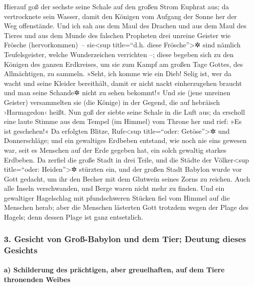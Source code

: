  Hierauf goß der sechste seine Schale auf den großen
Strom Euphrat aus; da vertrocknete sein Wasser, damit den Königen vom
Aufgang der Sonne her der Weg offenstände.  Und ich sah
aus dem Maul des Drachen und aus dem Maul des Tieres und aus dem Munde
des falschen Propheten drei unreine Geister wie Frösche
(hervorkommen)~--  sie\textless sup title=``d.h. diese
Frösche''\textgreater✲ sind nämlich Teufelsgeister, welche Wunderzeichen
verrichten --; diese begeben sich zu den Königen des ganzen Erdkreises,
um sie zum Kampf am großen Tage Gottes, des Allmächtigen, zu sammeln.
 »Seht, ich komme wie ein Dieb! Selig ist, wer da wacht
und seine Kleider bereithält, damit er nicht nackt einherzugehen braucht
und man seine Schande✲ nicht zu sehen bekommt!«  Und sie
(jene unreinen Geister) versammelten sie (die Könige) in der Gegend, die
auf hebräisch ›Harmagedon‹ heißt.  Nun goß der siebte
seine Schale in die Luft aus; da erscholl eine laute Stimme aus dem
Tempel (im Himmel) vom Throne her und rief: »Es ist geschehen!«
 Da erfolgten Blitze, Rufe\textless sup title=``oder:
Getöse''\textgreater✲ und Donnerschläge; und ein gewaltiges Erdbeben
entstand, wie noch nie eins gewesen war, seit es Menschen auf der Erde
gegeben hat, ein solch gewaltig starkes Erdbeben.  Da
zerfiel die große Stadt in drei Teile, und die Städte der
Völker\textless sup title=``oder: Heiden''\textgreater✲ stürzten ein,
und der großen Stadt Babylon wurde vor Gott gedacht, um ihr den Becher
mit dem Glutwein seines Zorns zu reichen.  Auch alle
Inseln verschwanden, und Berge waren nicht mehr zu finden.
 Und ein gewaltiger Hagelschlag mit pfundschweren Stücken
fiel vom Himmel auf die Menschen herab; aber die Menschen lästerten Gott
trotzdem wegen der Plage des Hagels; denn dessen Plage ist ganz
entsetzlich.

\hypertarget{gesicht-von-grouxdf-babylon-und-dem-tier-deutung-dieses-gesichts}{%
\subsubsection{3. Gesicht von Groß-Babylon und dem Tier; Deutung dieses
Gesichts}\label{gesicht-von-grouxdf-babylon-und-dem-tier-deutung-dieses-gesichts}}

\hypertarget{a-schilderung-des-pruxe4chtigen-aber-greuelhaften-auf-dem-tiere-thronenden-weibes}{%
\paragraph{a) Schilderung des prächtigen, aber greuelhaften, auf dem
Tiere thronenden
Weibes}\label{a-schilderung-des-pruxe4chtigen-aber-greuelhaften-auf-dem-tiere-thronenden-weibes}}

